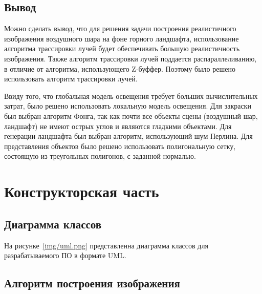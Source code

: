 
\section{Вывод}
Можно сделать вывод, что для решения задачи построения реалистичного изображения воздушного шара на фоне горного ландшафта, использование алгоритма трассировки лучей будет обеспечивать большую реалистичность изображения. Также алгоритм трассировки лучей поддается распараллеливанию, в отличие от алгоритма, использующего Z-буффер. Поэтому было решено использовать алгоритм трассировки лучей. 

Ввиду того, что глобальная модель освещения требует больших вычислительных затрат, было решено использовать локальную модель освещения. Для закраски был выбран алгоритм Фонга, так как почти все объекты сцены (воздушный шар, ландшафт) не имеют острых углов и являются гладкими объектами. Для генерации ландшафта был выбран алгоритм, использующий шум Перлина. Для представления объектов было решено использовать полигональную сетку, состоящую из треугольных полигонов, с заданной нормалью.

\chapter{Конструкторская часть}
\section{Диаграмма классов}
На рисунке~\ref{img/uml.png} представленна диаграмма классов для разрабатываемого ПО в формате UML.

\section{Алгоритм построения изображения}





\renewcommand\bibname{СПИСОК ИСПОЛЬЗОВАННЫХ ИСТОЧНИКОВ}




